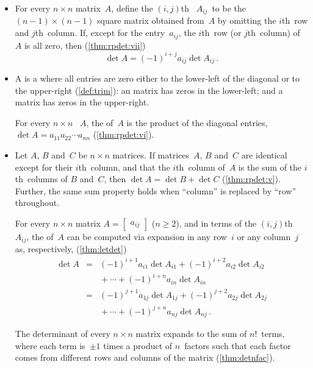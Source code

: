\begin{itemize}
\item For every \(n\times n\) matrix~\(A\),
define the \((i,j)\)th~ \(A_{ij}\)~to be the \((n-1)\times(n-1)\) square matrix obtained from~\(A\) by omitting the \(i\)th~row and \(j\)th~column.  
If, except for the entry~\(a_{ij}\), the \(i\)th~row (or \(j\)th~column) of~\(A\) is all zero, then (\autoref{thm:rpdet:vii})
\begin{equation*}
\det A=(-1)^{i+j}a_{ij}\det A_{ij}\,.
\end{equation*}

\item A  is a  where all entries are zero either to the lower-left of the diagonal or to the upper-right (\autoref{def:trim}): an  matrix has zeros in the lower-left; and a  matrix has zeros in the upper-right.

\itemme For every \(n\times n\) ~\(A\),
the  of~\(A\) is the product of the diagonal entries, \(\det A=a_{11}a_{22}\cdots a_{nn}\) (\autoref{thm:rpdet:vi}).

\item Let \(A\), \(B\) and~\(C\) be \(n\times n\) matrices.
If matrices~\(A\), \(B\) and~\(C\) are identical except for their \(i\)th~column, and that the \(i\)th~column of~\(A\) is the sum of the \(i\)th~columns of \(B\) and~\(C\), then \(\det A=\det B+\det C\) (\autoref{thm:rpdet:v}).
Further, the same sum property holds when ``column'' is replaced by ``row'' throughout.

\itemme For every \(n\times n\) matrix \(A=\begin{bmatrix} a_{ij} \end{bmatrix}\) (\(n\geq2\)), and in terms of the \((i,j)\)th ~\(A_{ij}\), the  of~\(A\) can be computed via expansion in any row~\(i\) or any column~\(j\) as, respectively, (\autoref{thm:letdet})
\begin{eqnarray*}
\det A
&=&(-1)^{i+1}a_{i1}\det A_{i1}
+(-1)^{i+2}a_{i2}\det A_{i2}
\nonumber\\&&{}
+\cdots+(-1)^{i+n}a_{in}\det A_{in}
\nonumber\\&=&(-1)^{j+1}a_{1j}\det A_{1j}
+(-1)^{j+2}a_{2j}\det A_{2j}
\nonumber\\&&{}
+\cdots+(-1)^{j+n}a_{nj}\det A_{nj}\,.
\end{eqnarray*}

\itemme The determinant of every \(n\times n\) matrix expands to the sum of \(n!\)~terms, where each term is~\(\pm1\) times a product of \(n\)~factors such that each factor comes from different rows and columns of the matrix (\autoref{thm:detnfac}).



\end{itemize}



\makeanswers
